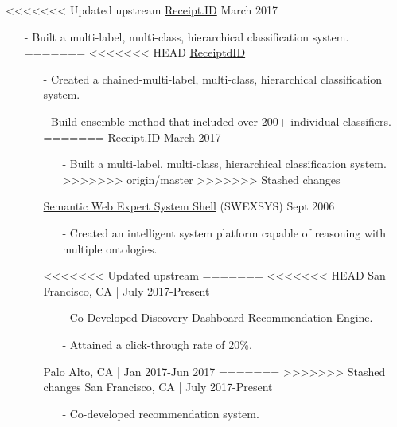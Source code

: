 \documentclass[11pt,article,oneside]{memoir}
\begin{document}
<<<<<<< Updated upstream
\ind \href{https://github.com/omoju/receiptdID}{Receipt.ID} \hfill March 2017 
\begin{itemize}[noitemsep,nolistsep]
\item[-] Built a multi-label, multi-class, hierarchical classification system.
=======
<<<<<<< HEAD
\ind \href{https://github.com/omoju/receiptdID}{ReceiptdID}
\begin{itemize}[noitemsep,nolistsep]
\item[-] Created a chained-multi-label, multi-class, hierarchical classification system.
\item[-] Build ensemble method that included over 200+ individual classifiers.
=======
\ind \href{https://github.com/omoju/receiptdID}{Receipt.ID} \hfill March 2017 
\begin{itemize}[noitemsep,nolistsep]
\item[-] Built a multi-label, multi-class, hierarchical classification system.
>>>>>>> origin/master
>>>>>>> Stashed changes
\end{itemize}

\ind \href{https://github.com/omoju/SWEXSYS}{Semantic Web Expert System Shell} (SWEXSYS) \hfill Sept 2006 
\begin{itemize}[noitemsep,nolistsep]
\item[-] Created an intelligent system platform capable of reasoning with multiple ontologies.
\end{itemize} 

\bigskip


\medskip

<<<<<<< Updated upstream
=======
<<<<<<< HEAD
 \hfill San Francisco, CA | July 2017-Present
\begin{itemize}[nolistsep]
\item[-]Co-Developed Discovery Dashboard Recommendation Engine.
\item[-]Attained a click-through rate of 20\%.
\end{itemize} 

 \hfill Palo Alto, CA | Jan 2017-Jun 2017
=======
>>>>>>> Stashed changes
 \hfill San Francisco, CA | July 2017-Present
\begin{itemize}[nolistsep]
\item[-]Co-developed recommendation system.
\end{itemize} 


\end{itemize}
\end{itemize}
\end{document}
